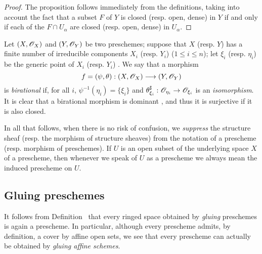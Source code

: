 \begin{proof}
The proposition follows immediately from the definitions, taking into account the fact that a subset $F$ of $Y$ is closed (resp. open, dense) in $Y$ if and only if each of the $F\cap U_\alpha$ are closed (resp. open, dense) in $U_\alpha$.
\end{proof}

\begin{env}[2.2.9]
\label{I.2.2.9}
Let $(X,\mathscr{O}_X)$ and $(Y,\mathscr{O}_Y)$ be two preschemes;
suppose that $X$ (resp. $Y$) has a finite number of irreducible components $X_i$ (resp. $Y_i$) ($1\leq i\leq n$);
let $\xi_i$ (resp. $\eta_i$) be the generic point of $X_i$ (resp. $Y_i$) .
We say that a morphism
\[
  f=(\psi,\theta):(X,\sh{O}_X)\to(Y,\sh{O}_Y)
\]
is \emph{birational} if, for all $i$, $\psi^{-1}(\eta_i)=\{\xi_i\}$ and $\theta_{\xi_i}^\sharp:\sh{O}_{\eta_i}\to\sh{O}_{\xi_i}$ is an \emph{isomorphism}.
It is clear that a birational morphism is dominant , and thus it is surjective if it is also closed.
\end{env}

\begin{notation}[2.2.10]
\label{I.2.2.10}
In all that follows, when there is no risk of confusion, we \emph{suppress} the structure sheaf (resp. the morphism of structure sheaves) from the notation of a prescheme (resp. morphism of preschemes).
If $U$ is an open subset of the underlying space $X$ of a prescheme, then whenever we speak of $U$ as a prescheme we always mean the induced prescheme on $U$.
\end{notation}

\subsection{Gluing preschemes}
\label{subsection:I.2.3}

\begin{env}[2.3.1]
\label{I.2.3.1}
It follows from Definition~ that every ringed space obtained by \emph{gluing} preschemes  is again a prescheme.
In particular, although every prescheme admits, by definition, a cover by affine open sets, we see that every prescheme can actually be obtained by \emph{gluing affine schemes}.
\end{env}

